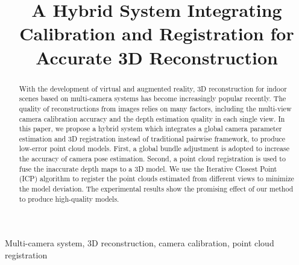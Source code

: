 \documentclass{article}
\begin{document}
\sloppy

\def\x{{\mathbf x}}
\def\L{{\cal L}}


\title{A Hybrid System Integrating Calibration and Registration for Accurate 3D Reconstruction}
%
\address{ }


\maketitle


%
\begin{abstract}
With the development of virtual and augmented reality, 3D reconstruction for indoor scenes based on multi-camera systems has become increasingly popular recently. 
%
The quality of reconstructions from images relies on many factors, including the multi-view camera calibration accuracy and the depth estimation quality in each single view. 
%
In this paper, we propose a hybrid system which integrates a global camera parameter estimation and 3D registration instead of traditional pairwise framework, to produce low-error point cloud models.
%
First, a global bundle adjustment is adopted to increase the accuracy of camera pose estimation. 
Second, a point cloud registration is used to fuse the inaccurate depth maps to a 3D model. 
We use the Iterative Closest Point (ICP) algorithm to register the point clouds estimated from different views to minimize the model deviation. 
The experimental results show the promising effect of our method to produce high-quality models.
\end{abstract}
%
\begin{keywords}
Multi-camera system, 3D reconstruction, camera calibration, point cloud registration
\end{keywords}
%










\end{document}
